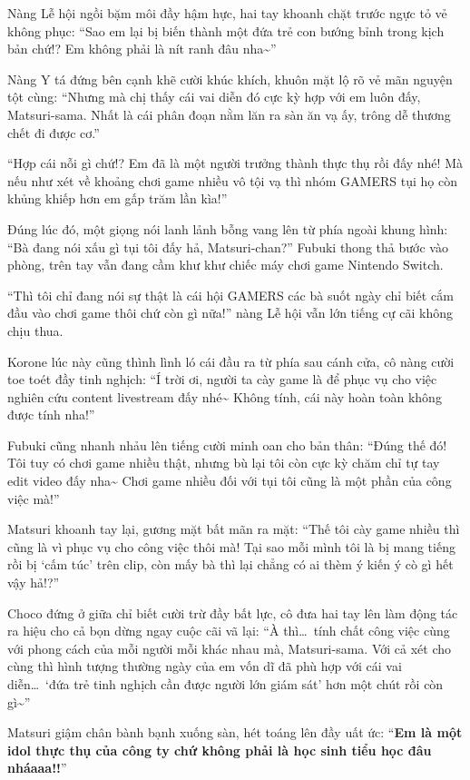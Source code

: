 \documentclass[../main.tex]{subfiles}
\begin{document}
Nàng Lễ hội ngồi bặm môi đầy hậm hực, hai tay khoanh chặt trước ngực tỏ vẻ không phục: ``Sao em lại bị biến thành một đứa trẻ con bướng bỉnh trong kịch bản chứ!? Em không phải là nít ranh đâu nha\~{}''

Nàng Y tá đứng bên cạnh khẽ cười khúc khích, khuôn mặt lộ rõ vẻ mãn nguyện tột cùng: ``Nhưng mà chị thấy cái vai diễn đó cực kỳ hợp với em luôn đấy, Matsuri-sama. Nhất là cái phân đoạn nằm lăn ra sàn ăn vạ ấy, trông dễ thương chết đi được cơ.''

``Hợp cái nỗi gì chứ!? Em đã là một người trưởng thành thực thụ rồi đấy nhé! Mà nếu như xét về khoảng chơi game nhiều vô tội vạ thì nhóm GAMERS tụi họ còn khủng khiếp hơn em gấp trăm lần kìa!''

Đúng lúc đó, một giọng nói lanh lảnh bỗng vang lên từ phía ngoài khung hình: ``Bà đang nói xấu gì tụi tôi đấy hả, Matsuri-chan?'' Fubuki thong thả bước vào phòng, trên tay vẫn đang cầm khư khư chiếc máy chơi game Nintendo Switch.

``Thì tôi chỉ đang nói sự thật là cái hội GAMERS các bà suốt ngày chỉ biết cắm đầu vào chơi game thôi chứ còn gì nữa!'' nàng Lễ hội vẫn lớn tiếng cự cãi không chịu thua.

Korone lúc này cũng thình lình ló cái đầu ra từ phía sau cánh cửa, cô nàng cười toe toét đầy tinh nghịch: ``Í trời ơi, người ta cày game là để phục vụ cho việc nghiên cứu content livestream đấy nhé\~{} Không tính, cái này hoàn toàn không được tính nha!''

Fubuki cũng nhanh nhảu lên tiếng cười minh oan cho bản thân: ``Đúng thế đó! Tôi tuy có chơi game nhiều thật, nhưng bù lại tôi còn cực kỳ chăm chỉ tự tay edit video đấy nha\~{} Chơi game nhiều đối với tụi tôi cũng là một phần của công việc mà!''

Matsuri khoanh tay lại, gương mặt bất mãn ra mặt: ``Thế tôi cày game nhiều thì cũng là vì phục vụ cho công việc thôi mà! Tại sao mỗi mình tôi là bị mang tiếng rồi bị `cấm túc' trên clip, còn mấy bà thì lại chẳng có ai thèm ý kiến ý cò gì hết vậy hả!?''

Choco đứng ở giữa chỉ biết cười trừ đầy bất lực, cô đưa hai tay lên làm động tác ra hiệu cho cả bọn dừng ngay cuộc cãi vã lại: ``À thì\dots\ tính chất công việc cùng với phong cách của mỗi người mỗi khác nhau mà, Matsuri-sama. Với cả xét cho cùng thì hình tượng thường ngày của em vốn dĩ đã phù hợp với cái vai diễn\dots\ `đứa trẻ tinh nghịch cần được người lớn giám sát' hơn một chút rồi còn gì\~{}''

Matsuri giậm chân bành bạnh xuống sàn, hét toáng lên đầy uất ức: ``\textbf{Em là một idol thực thụ của công ty chứ không phải là học sinh tiểu học đâu nháaaa!!}''
\end{document}
